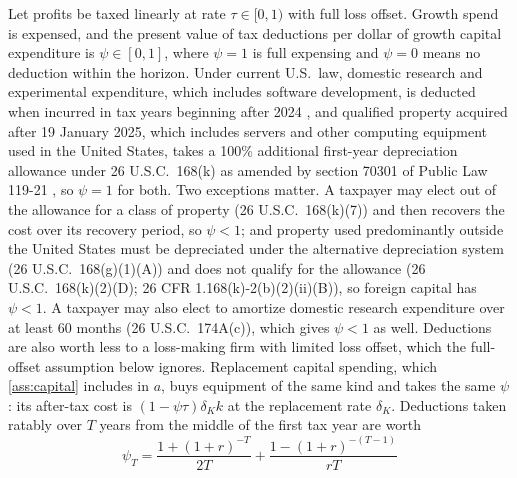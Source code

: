 \begin{remark}[Taxes]\label{rem:taxes}
Let profits be taxed linearly at rate $\tau\in[0,1)$ with full loss offset. Growth spend is expensed, and the present value of tax deductions per dollar of growth capital expenditure is $\psi\in[0,1]$, where $\psi=1$ is full expensing and $\psi=0$ means no deduction within the horizon. Under current U.S.\ law, domestic research and experimental expenditure, which includes software development, is deducted when incurred in tax years beginning after 2024 \citep{usc2026sec174a}, and qualified property acquired after 19 January 2025, which includes servers and other computing equipment used in the United States, takes a 100\% additional first-year depreciation allowance under 26 U.S.C.\ 168(k) as amended by section 70301 of Public Law 119-21 \citep[interim guidance in][]{irs2026notice202611}, so $\psi=1$ for both. Two exceptions matter. A taxpayer may elect out of the allowance for a class of property (26 U.S.C.\ 168(k)(7)) and then recovers the cost over its recovery period, so $\psi<1$; and property used predominantly outside the United States must be depreciated under the alternative depreciation system (26 U.S.C.\ 168(g)(1)(A)) and does not qualify for the allowance (26 U.S.C.\ 168(k)(2)(D); 26 CFR 1.168(k)-2(b)(2)(ii)(B)), so foreign capital has $\psi<1$. A taxpayer may also elect to amortize domestic research expenditure over at least 60 months (26 U.S.C.\ 174A(c)), which gives $\psi<1$ as well. Deductions are also worth less to a loss-making firm with limited loss offset, which the full-offset assumption below ignores. Replacement capital spending, which \autoref{ass:capital} includes in $a$, buys equipment of the same kind and takes the same $\psi$: its after-tax cost is $(1-\psi\tau)\delta_Kk$ at the replacement rate $\delta_K$. Deductions taken ratably over $T$ years from the middle of the first tax year are worth
\begin{equation}\label{eq:psiT}
\psi_T=\frac{1+(1+r)^{-T}}{2T}+\frac{1-(1+r)^{-(T-1)}}{rT}
\end{equation}

\end{remark}
